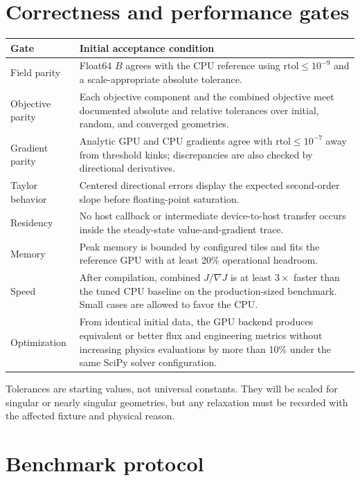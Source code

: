 \documentclass[11pt,a4paper]{article}
\begin{document}
\section{Correctness and performance gates}\label{sec:gates}

\begin{longtable}{p{}p{}}
\toprule
Gate & Initial acceptance condition \\
\midrule
\endhead
Field parity & Float64 $B$ agrees with the CPU reference using
  $\mathrm{rtol}\leq10^{-9}$ and a scale-appropriate absolute tolerance. \\
Objective parity & Each objective component and the combined objective meet
  documented absolute and relative tolerances over initial, random, and
  converged geometries. \\
Gradient parity & Analytic GPU and CPU gradients agree with
  $\mathrm{rtol}\leq10^{-7}$ away from threshold kinks; discrepancies are also
  checked by directional derivatives. \\
Taylor behavior & Centered directional errors display the expected second-order
  slope before floating-point saturation. \\
Residency & No host callback or intermediate device-to-host transfer occurs
  inside the steady-state value-and-gradient trace. \\
Memory & Peak memory is bounded by configured tiles and fits the reference GPU
  with at least 20\% operational headroom. \\
Speed & After compilation, combined $J/\nabla J$ is at least $3\times$ faster
  than the tuned CPU baseline on the production-sized benchmark.  Small cases
  are allowed to favor the CPU. \\
Optimization & From identical initial data, the GPU backend produces equivalent
  or better flux and engineering metrics without increasing physics evaluations
  by more than 10\% under the same SciPy solver configuration. \\
\bottomrule
\end{longtable}

Tolerances are starting values, not universal constants.  They will be scaled
for singular or nearly singular geometries, but any relaxation must be recorded
with the affected fixture and physical reason.

\section{Benchmark protocol}
\end{document}
